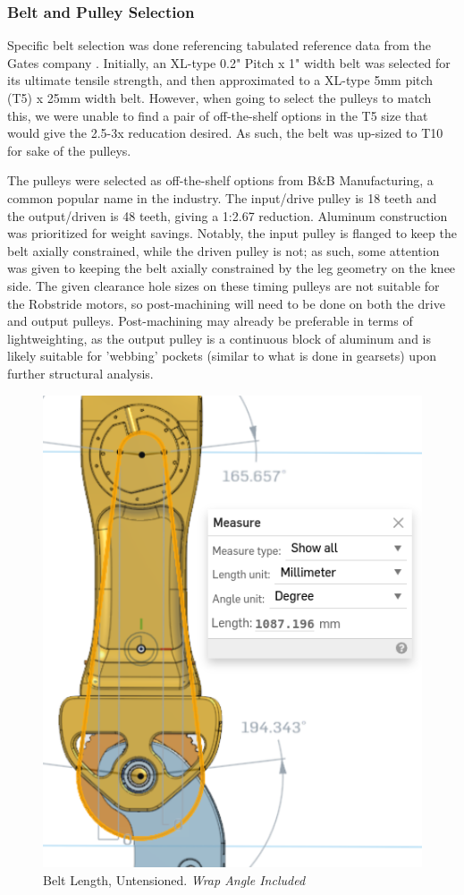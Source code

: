 \documentclass{article}
\begin{document}
\subsubsection{Belt and Pulley Selection}

Specific belt selection was done referencing tabulated reference data from the Gates company \cite{gates_synchronous_nodate}. Initially, an XL-type 0.2" Pitch x 1" width belt was selected for its ultimate tensile strength, and then approximated to a XL-type 5mm pitch (T5) x 25mm width belt. However, when going to select the pulleys to match this, we were unable to find a pair of off-the-shelf options in the T5 size that would give the 2.5-3x reducation desired. As such, the belt was up-sized to T10 for sake of the pulleys.

The pulleys were selected as off-the-shelf options from B\&B Manufacturing, a common popular name in the industry. The input/drive pulley is 18 teeth and the output/driven is 48 teeth, giving a 1:2.67 reduction. Aluminum construction was prioritized for weight savings. Notably, the input pulley is flanged to keep the belt axially constrained, while the driven pulley is not; as such, some attention was given to keeping the belt axially constrained by the leg geometry on the knee side. The given clearance hole sizes on these timing pulleys are not suitable for the Robstride motors, so post-machining will need to be done on both the drive and output pulleys. Post-machining may already be preferable in terms of lightweighting, as the output pulley is a continuous block of aluminum and is likely suitable for 'webbing' pockets (similar to what is done in gearsets) upon further structural analysis. 

\begin{figure}
    \centering
    \includegraphics[width=0.5\linewidth]{assets/BoMPurchasedParts/MOHRA_BeltLength_Untensioned.png}
    \caption{Belt Length, Untensioned. \textit{Wrap Angle Included}}
    \label{fig:enter-label}
\end{figure}
\end{document}
